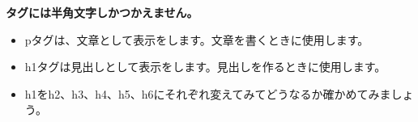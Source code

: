 \documentclass[a4paper,12pt]{jarticle}
\begin{document}
\textbf{タグには半角文字しかつかえません。}

\begin{itemize}
  \item pタグは、文章として表示をします。文章を書くときに使用します。

  \item h1タグは見出しとして表示をします。見出しを作るときに使用します。
\end{itemize}


\vfill

\theQuestion\label{Q:hasAnswer04-2}

\begin{itemize}
  \item[]
    h1をh2、h3、h4、h5、h6にそれぞれ変えてみてどうなるか確かめてみましょう。
\end{itemize}

\bigskip
\end{document}
